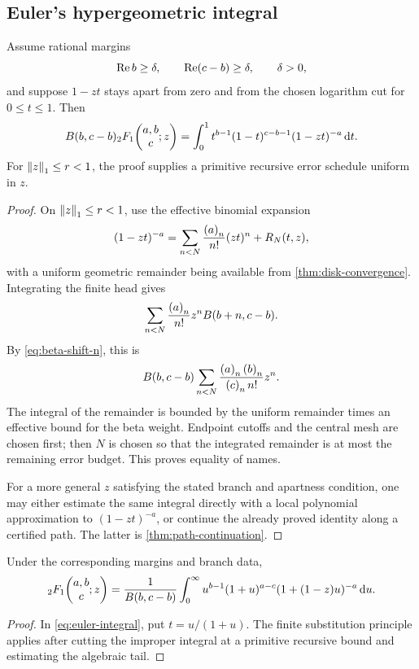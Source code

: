 \subsection{Euler's hypergeometric integral}

\begin{theorem}\label{thm:euler-integral}
Assume rational margins
\[
 \operatorname{Re} b\ge\delta,
 \qquad
 \operatorname{Re}(c-b)\ge\delta,
 \qquad \delta>0,
\]
and suppose \(1-zt\) stays apart from zero and from the chosen logarithm cut
for \(0\le t\le1\).  Then
\begin{equation}\label{eq:euler-integral}
 B(b,c-b){}_2F_1\!\left(\begin{matrix}a,b\\c\end{matrix};z\right)
 =\int_0^1t^{b-1}(1-t)^{c-b-1}(1-zt)^{-a}\,\mathrm d t.
\end{equation}
For \(\left\lVert z\right\rVert_1\le r<1\), the proof supplies a primitive recursive error
schedule uniform in \(z\).
\end{theorem}

\begin{proof}
On \(\left\lVert z\right\rVert_1\le r<1\), use the effective binomial expansion
\[
 (1-zt)^{-a}=\sum_{n<N}\frac{\left(a\right)_{n}}{n!}(zt)^n+R_N(t,z),
\]
with a uniform geometric remainder being available from
\cref{thm:disk-convergence}.  Integrating the finite head gives
\[
 \sum_{n<N}\frac{\left(a\right)_{n}}{n!}z^nB(b+n,c-b).
\]
By \eqref{eq:beta-shift-n}, this is
\[
 B(b,c-b)\sum_{n<N}
 \frac{\left(a\right)_{n}\left(b\right)_{n}}{\left(c\right)_{n} n!}z^n.
\]
The integral of the remainder is bounded by the uniform remainder times an
effective bound for the beta weight.  Endpoint cutoffs and the central mesh
are chosen first; then \(N\) is chosen so that the integrated remainder is at
most the remaining error budget.  This proves equality of names.

For a more general \(z\) satisfying the stated branch and apartness condition,
one may either estimate the same integral directly with a local polynomial
approximation to \((1-zt)^{-a}\), or continue the already proved identity
along a certified path.  The latter is \cref{thm:path-continuation}.
\end{proof}

\begin{corollary}[The \([0,\infty)\) Euler form]\label{cor:euler-infty}
Under the corresponding margins and branch data,
\[
 {}_2F_1\!\left(\begin{matrix}a,b\\c\end{matrix};z\right)
 =\frac1{B(b,c-b)}
 \int_0^\infty
 u^{b-1}(1+u)^{a-c}(1+(1-z)u)^{-a}\,\mathrm d u.
\]
\end{corollary}

\begin{proof}
In \eqref{eq:euler-integral}, put \(t=u/(1+u)\).  The finite substitution
principle applies after cutting the improper integral at a primitive
recursive bound and estimating the algebraic tail.
\end{proof}

